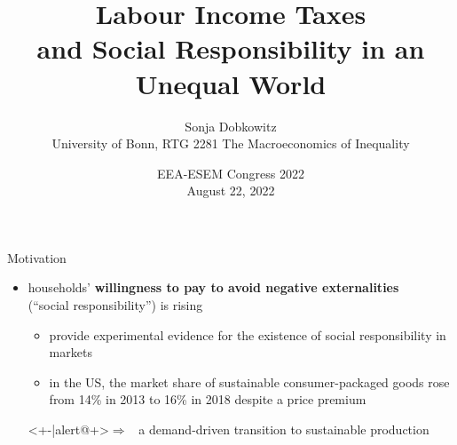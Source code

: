 \documentclass[11pt,aspectratio=169]{beamer}
\author[Sonja Dobkowitz]{\small Sonja Dobkowitz\\ \footnotesize{University of Bonn, RTG 2281 The Macroeconomics of Inequality}\\ }
\institute[University of Bonn]{}
\title{Labour Income Taxes\\ and Social Responsibility in an Unequal World }
\date{\small{EEA-ESEM Congress 2022\\ August 22, 2022 }}
\newcommand{\ar}{$\Rightarrow$ \ }
\begin{document}
	
	{
		\begin{frame}
			\titlepage
		\end{frame}
	}
	\addtocounter{framenumber}{-1}
	
	
	
	
	
	
	\begin{frame}{Motivation}
		\vspace{4mm}
		\begin{itemize}[<+-| alert@+>]
			
			\item<+-|alert@+>households'  \textcolor{myorange}{\textbf{willingness to pay to avoid negative externalities}} \\ (``social responsibility'') is rising  %

			\begin{itemize}
				\vspace{4mm}
				\item<+->  \cite{Bartling2015DoResponsibility} provide experimental evidence for the existence of social responsibility in markets 
				\vspace{2mm}
				\item<+-> in the US, the market share of sustainable consumer-packaged goods rose from 14\% in 2013 to 16\% in 2018 despite a price premium \citep{Kronthal-Sacco2020SustainableMessages}%
			\end{itemize} %
			\vspace{5mm}
			\item[]<+-|alert@+>\ar {a demand-driven transition to sustainable production}
			\vspace{5mm}
			

\end{itemize}
\end{frame}
\end{document}
